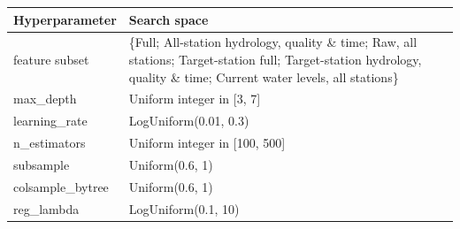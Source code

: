 \begin{tabularx}{\textwidth}{@{}lX@{}}
\toprule
\textbf{Hyperparameter} & \textbf{Search space} \\
\midrule
feature subset & \{Full; All-station hydrology, quality \& time; Raw, all stations; Target-station full; Target-station hydrology, quality \& time; Current water levels, all stations\} \\
\addlinespace
max\_depth & Uniform integer in [3, 7] \\
\addlinespace
learning\_rate & LogUniform(0.01, 0.3) \\
\addlinespace
n\_estimators & Uniform integer in [100, 500] \\
\addlinespace
subsample & Uniform(0.6, 1) \\
\addlinespace
colsample\_bytree & Uniform(0.6, 1) \\
\addlinespace
reg\_lambda & LogUniform(0.1, 10) \\
\bottomrule
\end{tabularx}
